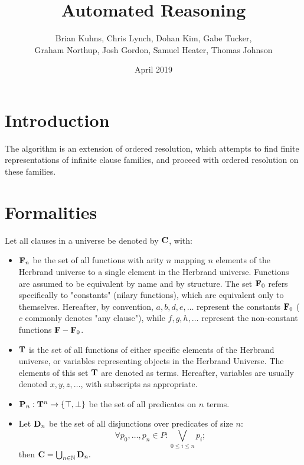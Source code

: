 \documentclass{article}
\title{Automated Reasoning}
\author{
	Brian Kuhns,
	Chris Lynch,
	Dohan Kim,
	Gabe Tucker, \\
	Graham Northup,
	Josh Gordon,
	Samuel Heater,
	Thomas Johnson
  }
\date{April 2019}
\newcommand{\allclauses}[0]{{\bf C}}
\newcommand{\allvars}[0]{{\bf V}}
\newcommand{\allpreds}[0]{{\bf P}}
\newcommand{\allterms}[0]{{\bf T}}
\newcommand{\allfuncs}[0]{{\bf F}}
\newcommand{\constfuncs}[0]{\allfuncs_0}
\newcommand{\true}[0]{\top}
\newcommand{\false}[0]{\bot}
\newcommand{\nat}[0]{{\mathbb N}}
\begin{document}
\maketitle

\section{Introduction}


The algorithm is an extension of ordered resolution,
which attempts to find finite representations of infinite clause families,
and proceed with ordered resolution on these families.

\section{Formalities}

Let all clauses in a universe be denoted by $\allclauses$, with:
\begin{itemize}
	\item $\allfuncs_n$ be the set of all functions with arity $n$ mapping $n$ elements of the Herbrand universe to a single element in the Herbrand universe. Functions are assumed to be equivalent by name and by structure. The set $\constfuncs$ refers specifically to "constants" (nilary functions), which are equivalent only to themselves. Hereafter, by convention, $a, b, d, e, \ldots$ represent the constants $\constfuncs$ ($c$ commonly denotes "any clause"), while $f, g, h, \ldots$ represent the non-constant functions $\allfuncs - \constfuncs$.
	\item $\allterms$ is the set of all functions of either specific elements of the Herbrand universe, or variables representing objects in the Herbrand Universe. The elements of this set $\allterms$ are denoted as terms. Hereafter, variables are usually denoted $x, y, z, \ldots$, with subscripts as appropriate.
	\item $\allpreds_n : \allterms^n \rightarrow \{\true,\false\}$ be the set of all predicates on $n$ terms. %
	\item Let ${\bf D}_n$ be the set of all disjunctions over predicates of size $n$:
		$$
		\forall p_0,\ldots,p_n \in P: \bigvee_{0 \leq i \leq n} p_i;
		$$
		then $\allclauses = \bigcup_{n \in \nat} {\bf D}_n.$
\end{itemize}
\end{document}
